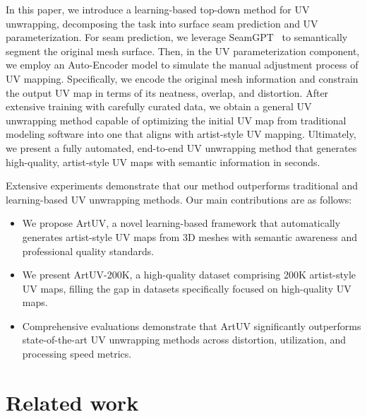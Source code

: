 \documentclass{article}
\begin{document}
In this paper, we introduce a learning-based top-down method for UV unwrapping, decomposing the task into surface seam prediction and UV parameterization. For seam prediction, we leverage SeamGPT~\cite{li2025auto} to semantically segment the original mesh surface. Then, in the UV parameterization component, we employ an Auto-Encoder model to simulate the manual adjustment process of UV mapping. Specifically, we encode the original mesh information and constrain the output UV map in terms of its neatness, overlap, and distortion. After extensive training with carefully curated data, we obtain a general UV unwrapping method capable of optimizing the initial UV map from traditional modeling software into one that aligns with artist-style UV mapping. Ultimately, we present a fully automated, end-to-end UV unwrapping method that generates high-quality, artist-style UV maps with semantic information in seconds.

Extensive experiments demonstrate that our method outperforms traditional and learning-based UV unwrapping methods. Our main contributions are as follows:
\begin{itemize}
\item We propose ArtUV, a novel learning-based framework that automatically generates artist-style UV maps from 3D meshes with semantic awareness and professional quality standards.
\item We present ArtUV-200K, a high-quality dataset comprising 200K artist-style UV maps, filling the gap in datasets specifically focused on high-quality UV maps.
\item Comprehensive evaluations demonstrate that ArtUV significantly outperforms state-of-the-art UV unwrapping methods across distortion, utilization, and processing speed metrics.
\end{itemize}

\section{Related work}
\end{document}
